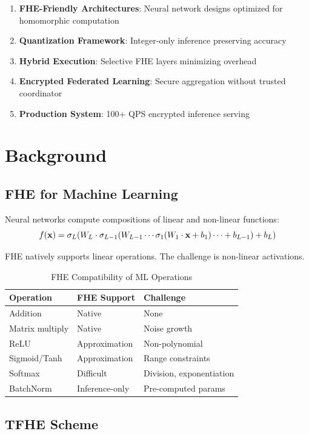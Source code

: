 \documentclass{../shared/luxfhe}
\begin{document}
\begin{enumerate}
    \item \textbf{FHE-Friendly Architectures}: Neural network designs optimized for homomorphic computation
    \item \textbf{Quantization Framework}: Integer-only inference preserving accuracy
    \item \textbf{Hybrid Execution}: Selective FHE layers minimizing overhead
    \item \textbf{Encrypted Federated Learning}: Secure aggregation without trusted coordinator
    \item \textbf{Production System}: 100+ QPS encrypted inference serving
\end{enumerate}

\section{Background}

\subsection{FHE for Machine Learning}

Neural networks compute compositions of linear and non-linear functions:
\[
f(\mathbf{x}) = \sigma_L(W_L \cdot \sigma_{L-1}(W_{L-1} \cdots \sigma_1(W_1 \cdot \mathbf{x} + b_1) \cdots + b_{L-1}) + b_L)
\]

FHE natively supports linear operations. The challenge is non-linear activations.

\begin{table}[h]
\centering
\caption{FHE Compatibility of ML Operations}
\begin{tabular}{lll}
\toprule
Operation & FHE Support & Challenge \\
\midrule
Addition & Native & None \\
Matrix multiply & Native & Noise growth \\
ReLU & Approximation & Non-polynomial \\
Sigmoid/Tanh & Approximation & Range constraints \\
Softmax & Difficult & Division, exponentiation \\
BatchNorm & Inference-only & Pre-computed params \\
\bottomrule
\end{tabular}
\end{table}

\subsection{TFHE Scheme}
\end{document}
